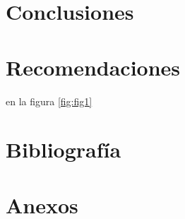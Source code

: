 \documentclass[12pt]{article}
\begin{document}
		
		
		
		
	
	\newpage
	
	\section{Conclusiones}
	\newpage
	
	\section{Recomendaciones}
	en la figura \ref{fig:fig1}
	\newpage
	
	\section{Bibliograf\'ia}
	\printbibliography[title={" "}]
	\newpage
	
	\section{Anexos}
	
	
\end{document}
